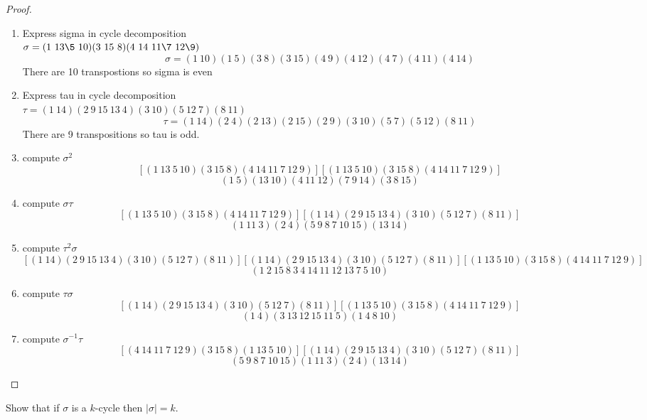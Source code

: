 \documentclass[11pt]{article}
\theoremstyle{definition}  %
\newcommand{\block}[2]{\begin{tcolorbox}[title={#1}]{#2}\end{tcolorbox}}
\begin{document}
\begin{proof}
\begin{enumerate}
  \item Express sigma in cycle decomposition\\
  $\sigma=(1\ 13 \5 \ 10)(3 \ 15 \ 8)(4 \ 14 \ 11 \7 \ 12 \9)$
  \[
    \sigma=(1 \ 10)(1 \ 5)(3 \ 8) ( 3 \ 15)(4 \ 9)( 4 \ 12)( 4 \ 7)( 4\ 11) ( 4 \ 14)
  \]
  There are 10 transpostions so sigma is even
  \item Express tau in cycle decomposition\\
  $\tau=(1 \ 14)(2\ 9 \ 15 \ 13 \ 4)(3 \ 10)(5 \ 12 \ 7)(8 \ 11)$
  \[
    \tau=( 1 \ 14)( 2 \ 4 )(2 \ 13)( 2 \ 15) ( 2 \ 9)(3 \ 10) ( 5 \ 7) ( 5 \ 12) ( 8 \ 11)
  \]
  There are 9 transpositions so tau is odd.
  \item compute $\sigma^2$\\
  \[
    \left[(1\ 13 \ 5 \ 10)(3 \ 15 \ 8)(4 \ 14 \ 11 \ 7 \ 12 \ 9)\right]\left[(1\ 13 \ 5 \ 10)(3 \ 15 \ 8)(4 \ 14 \ 11 \ 7 \ 12 \ 9)\right]
  \]
  \[
  (1 \ 5)(13 \ 10 )( 4 \ 11 \ 12)(7 \ 9 \ 14)( 3\  8 \ 15)
  \]
  \item compute $\sigma \tau$\\
  \[
  [(1\ 13 \ 5 \ 10)(3 \ 15 \ 8)(4 \ 14 \ 11 \ 7 \ 12 \ 9)][(1 \ 14)(2\ 9 \ 15 \ 13 \ 4)(3 \ 10)(5 \ 12 \ 7)(8 \ 11)]
  \]
  \[
    (1 \ 11 \ 3)(2\ 4)( 5\ 9\ 8\ 7 \ 10 \ 15 )(13\ 14)
  \]
  \item compute $\tau^2\sigma$\\
  \[
  [(1 \ 14)(2\ 9 \ 15 \ 13 \ 4)(3 \ 10)(5 \ 12 \ 7)(8 \ 11)][(1 \ 14)(2\ 9 \ 15 \ 13 \ 4)(3 \ 10)(5 \ 12 \ 7)(8 \ 11)][(1\ 13 \ 5 \ 10)(3 \ 15 \ 8)(4 \ 14 \ 11 \ 7 \ 12 \ 9)]
  \]
  \[
    (1 \ 2 \ 15\ 8\ 3\ 4 \ 14 \ 11 \ 12 \ 13\ 7\ 5 \ 10)
  \]
  \item compute $\tau \sigma$\\
  \[
[(1 \ 14)(2\ 9 \ 15 \ 13 \ 4)(3 \ 10)(5 \ 12 \ 7)(8 \ 11)][(1\ 13 \ 5 \ 10)(3 \ 15 \ 8)(4 \ 14 \ 11 \ 7 \ 12 \ 9)]
  \]
  \[
    (1\ 4)(3 \ 13\ 12 \ 15 \ 11 \ 5)(1\ 4 \ 8 \ 10)
  \]
  \item compute $\sigma^{-1} \tau$\\
  \[
    [(4 \ 14 \ 11 \ 7 \ 12 \ 9)(3 \ 15 \ 8)(1\ 13 \ 5 \ 10)][(1 \ 14)(2\ 9 \ 15 \ 13 \ 4)(3 \ 10)(5 \ 12 \ 7)(8 \ 11)]
  \]
  \[
  ( 5\ 9 \ 8 \ 7 \ 10 \ 15)(1 \ 11 \ 3)(2 \ 4)(13 \ 14)
  \]
\end{enumerate}
\end{proof}
\block{Question #2}{
Show that if $\sigma$ is a $k$-cycle then $|\sigma| = k$.
}
\end{document}
